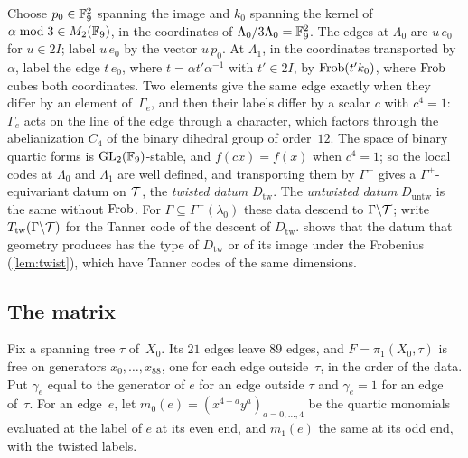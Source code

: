 Choose $p_0\in\mathbb{F}_9^2$ spanning the image and $k_0$ spanning the kernel of $\alpha\bmod3\in M_2(\mathbb{F}_9)$, in the coordinates
of $\Lambda_0/3\Lambda_0=\mathbb{F}_9^2$. The edges at $\Lambda_0$ are $u\,e_0$ for $u\in2I$; label $u\,e_0$ by the vector
$u\,p_0$. At $\Lambda_1$, in the coordinates transported by~$\alpha$, label the edge $t\,e_0$, where
$t=\alpha t'\alpha^{-1}$ with $t'\in2I$, by $\operatorname{Frob}(t'k_0)$, where $\operatorname{Frob}$ cubes both coordinates. Two elements give the
same edge exactly when they differ by an element of~$\Gamma_e$, and then their labels differ by a scalar $c$ with
$c^4=1$: $\Gamma_e$ acts on the line of the edge through a character, which factors through the abelianization $C_4$ of
the binary dihedral group of order~$12$. The space of binary quartic forms is $\operatorname{GL}_2(\mathbb{F}_9)$-stable, and $f(cx)=f(x)$ when
$c^4=1$; so the local codes at $\Lambda_0$ and $\Lambda_1$ are well defined, and transporting them by $\Gamma^+$ gives a
$\Gamma^+$-equivariant datum on $\mathcal{T}$, the \emph{twisted datum} $D_{\mathrm{tw}}$. The \emph{untwisted datum}
$D_{\mathrm{untw}}$ is the same without $\operatorname{Frob}$. For $\Gamma\subseteq\Gamma^+(\lambda_0)$ these data descend to
$\Gamma\backslash\mathcal{T}$; write $T_{\mathrm{tw}}(\Gamma\backslash\mathcal{T})$ for the Tanner code of the descent of
$D_{\mathrm{tw}}$.  shows that the datum that geometry produces has the type of $D_{\mathrm{tw}}$ or
of its image under the Frobenius (\cref{lem:twist}), which have Tanner codes of the same dimensions.

\subsection{The matrix}\label{sec:matrix}

Fix a spanning tree $\tau$ of~$X_0$. Its $21$ edges leave $89$ edges, and $F=\pi_1(X_0,\tau)$ is free on generators
$x_0,\dots,x_{88}$, one for each edge outside~$\tau$, in the order of the data. Put $\gamma_e$ equal to the generator of
$e$ for an edge outside $\tau$ and $\gamma_e=1$ for an edge of~$\tau$. For an edge~$e$, let
$m_0(e)=(x^{4-a}y^a)_{a=0,\dots,4}$ be the quartic monomials evaluated at the label of $e$ at its even end, and $m_1(e)$
the same at its odd end, with the twisted labels.

